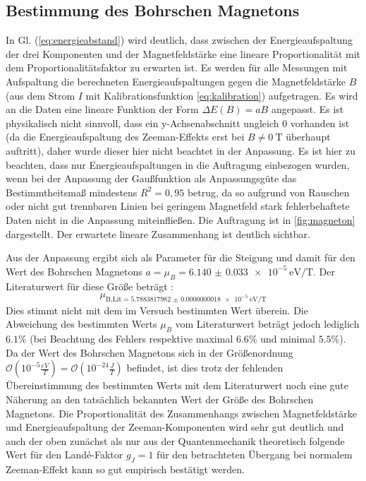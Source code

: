 \subsection{Bestimmung des Bohrschen Magnetons}

In Gl. (\ref{eq:energieabstand}) wird deutlich, dass zwischen der Energieaufspaltung der drei Komponenten und der Magnetfeldstärke eine lineare Proportionalität mit dem Proportionalitätsfaktor zu erwarten ist. Es werden für alle Messungen mit Aufspaltung die berechneten Energieaufspaltungen gegen die Magnetfeldstärke $B$ (aus dem Strom $I$ mit Kalibrationsfunktion \ref{eq:kalibration}) aufgetragen. Es wird an die Daten eine lineare Funktion der Form $\Delta E (B)=aB$ angepasst. Es ist physikalisch nicht sinnvoll, dass ein y-Achsenabschnitt ungleich 0 vorhanden ist (da die Energieaufspaltung des Zeeman-Effekts erst bei $B\not=\SI{0}{\tesla}$ überhaupt auftritt), daher wurde dieser hier nicht beachtet in der Anpassung.
Es ist hier zu beachten, dass nur Energieaufspaltungen in die Auftragung einbezogen wurden, wenn bei der Anpassung der Gaußfunktion als Anpassungsgüte das Bestimmtheitsmaß mindestens $R^2=0,95$ betrug, da so aufgrund von Rauschen oder nicht gut trennbaren Linien bei geringem Magnetfeld stark fehlerbehaftete Daten nicht in die Anpassung miteinfließen. Die Auftragung ist in \ref{fig:magneton} dargestellt. Der erwartete lineare Zusammenhang ist deutlich sichtbar.


Aus der Anpassung ergibt sich als Parameter für die Steigung und damit für den Wert des Bohrschen Magnetons $a=\mu_B=\SI{6.140(33)e-5}{\eV\per\tesla}$. Der Literaturwert für diese Größe beträgt \cite{NISTmagneton}:
\[\mu_{\text{B,Lit}=\SI{5.7883817982(18)e-5}{\eV\per\tesla}}\]
Dies stimmt nicht mit dem im Versuch bestimmten Wert überein. Die Abweichung des bestimmten Werts $\mu_B$ vom Literaturwert beträgt jedoch lediglich $6.1\%$ (bei Beachtung des Fehlers respektive maximal $6.6\%$ und minimal $5.5\%$). Da der Wert des Bohrschen Magnetons sich in der Größenordnung $\mathcal{O}\left(10^{-5}\unit{ \frac{eV}{T}}\right)=\mathcal{O}\left(10^{-24}\unit{ \frac{J}{T}}\right)$ \cite{NISTmagneton2} befindet, ist dies trotz der fehlenden Übereinstimmung des bestimmten Werts mit dem Literaturwert noch eine gute Näherung an den tatsächlich bekannten Wert der Größe des Bohrschen Magnetons. Die Proportionalität des Zusammenhangs zwischen Magnetfeldstärke und Energieaufspaltung der Zeeman-Komponenten wird sehr gut deutlich und auch der oben zunächst als nur aus der Quantenmechanik theoretisch folgende Wert für den Landé-Faktor $g_J=1$ für den betrachteten Übergang bei normalem Zeeman-Effekt kann so gut empirisch bestätigt werden.


